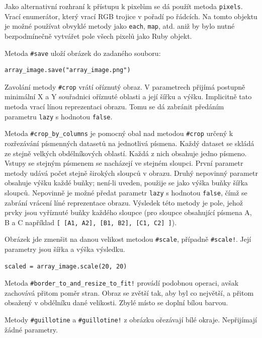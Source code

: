 \documentclass[a4paper]{article}
\begin{document}
Jako alternativní rozhraní k přístupu k pixelům se dá použít metoda
\texttt{pixels}. Vrací enumerátor, který vrací RGB trojice v pořadí
po řádcích. Na tomto objektu je možné používat obvyklé metody jako
\texttt{each}, \texttt{map}, atd. aniž by bylo nutné bezpodmínečně
vytvářet pole všech pixelů jako Ruby objekt.

Metoda \texttt{\#save} uloží obrázek do zadaného souboru:
\begin{lstlisting}
array_image.save("array_image.png")
\end{lstlisting}

Zavolání metody \texttt{\#crop} vrátí oříznutý obraz. V parametrech přijímá
postupně minimální X a Y souřadnici oříznuté oblasti a její šířku a výšku.
Implicitně tato metoda vrací línou reprezentaci obrazu. Tomu se dá zabránit
předáním parametru \texttt{lazy} s hodnotou \texttt{false}.

Metoda \texttt{\#crop\_by\_columns} je pomocný obal nad metodou \texttt{\#crop}
určený k rozřezávání písmenných datasetů na jednotlivá písmena. Každý dataset
se skládá ze stejně velkých obdélníkových oblastí. Každá z nich obsahuje jedno
písmeno. Vstupy se stejným písmenem se nacházejí ve stejném sloupci.
První parametr metody udává počet stejně širokých sloupců v obrazu.
Druhý nepovinný parametr obsahuje výšku každé buňky; není-li uveden, použije
se jako výška buňky šířka sloupců. Nepovinně je možné předat parametr
\texttt{lazy} s hodnotou \texttt{false}, čímž se zabrání vrácení líné
reprezentace obrazu. Výsledek této metody je pole, jehož prvky jsou vyříznuté
buňky každého sloupce (pro sloupce obsahující písmena A, B a C například
\texttt{[ [A1, A2], [B1, B2], [C1, C2] ]}).

Obrázek jde zmenšit na danou velikost metodou \texttt{\#scale}, případně
\texttt{\#scale!}. Její parametry jsou šířka a výška výsledku.
\begin{lstlisting}
scaled = array_image.scale(20, 20)
\end{lstlisting}
Metoda \texttt{\#border\_to\_and\_resize\_to\_fit!} provádí podobnou operaci,
avšak zachovává přitom poměr stran. Obraz se zvětší tak, aby byl co největší,
a přitom obsažený v obdélníku dané velikosti. Zbylé místo se doplní bílou
barvou.

Metody \texttt{\#guillotine} a \texttt{\#guillotine!} z obrázku ořezávají
bílé okraje. Nepřijímají žádné parametry.
\end{document}
